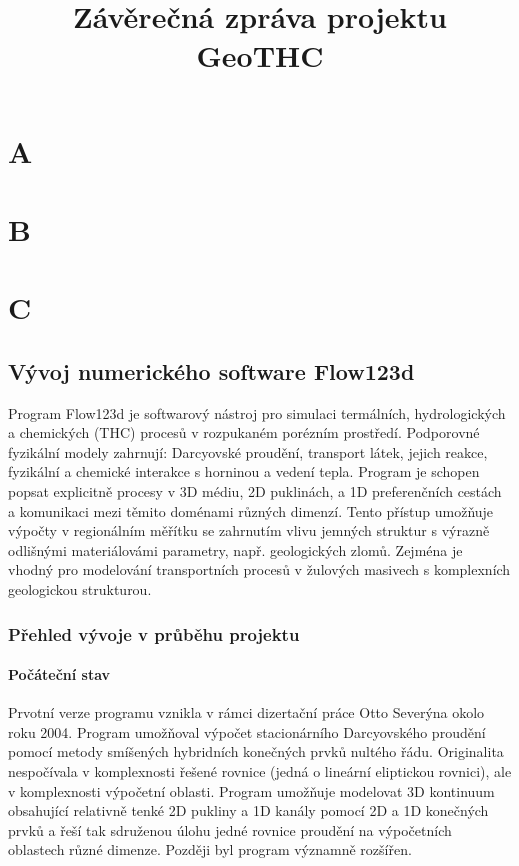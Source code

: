 \documentclass[11pt]{report}
\begin{document}

\title{Závěrečná zpráva projektu GeoTHC}
\maketitle
\chapter{A}
\chapter{B}
\chapter{C}

\pagebreak
\setcounter{page}{10}
\section{Vývoj numerického software Flow123d}
Program Flow123d je softwarový nástroj pro simulaci termálních, hydrologických 
a chemických (THC) procesů v rozpukaném porézním prostředí. Podporovné 
fyzikální modely zahrnují: Darcyovské proudění, transport látek, jejich reakce, 
fyzikální a chemické interakce s horninou a vedení tepla. Program je schopen 
popsat explicitně procesy v 3D médiu, 2D puklinách, a 1D preferenčních cestách a 
komunikaci mezi těmito doménami různých dimenzí. Tento přístup umožňuje výpočty 
v regionálním měřítku se zahrnutím vlivu jemných struktur s výrazně odlišnými 
materiálovámi parametry, např. geologických zlomů. Zejména je vhodný pro  
modelování transportních procesů v žulových masivech s komplexních geologickou 
strukturou.  

\subsection{Přehled vývoje v průběhu projektu}

\subsubsection{Počáteční stav}
Prvotní verze programu vznikla v rámci dizertační práce 
Otto Severýna okolo roku 2004. Program umožňoval výpočet stacionárního 
Darcyovského proudění pomocí metody smíšených hybridních konečných prvků 
nultého řádu. Originalita nespočívala v komplexnosti řešené rovnice (jedná o 
lineární eliptickou rovnici), ale v komplexnosti výpočetní oblasti. Program 
umožňuje modelovat 3D kontinuum obsahující relativně tenké 2D pukliny a 1D 
kanály pomocí 2D a 1D konečných prvků a řeší tak sdruženou úlohu jedné rovnice 
proudění na výpočetních oblastech různé dimenze. Později byl program významně 
rozšířen.
\end{document}
